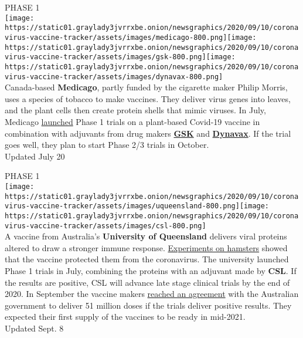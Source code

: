 PHASE 1\\
\texttt{[image: https://static01.graylady3jvrrxbe.onion/newsgraphics/2020/09/10/coronavirus-vaccine-tracker/assets/images/medicago-800.png]}\texttt{[image: https://static01.graylady3jvrrxbe.onion/newsgraphics/2020/09/10/coronavirus-vaccine-tracker/assets/images/gsk-800.png]}\texttt{[image: https://static01.graylady3jvrrxbe.onion/newsgraphics/2020/09/10/coronavirus-vaccine-tracker/assets/images/dynavax-800.png]}\\
Canada-based \textbf{\textbf{Medicago}}, partly funded by the cigarette
maker Philip Morris, uses a species of tobacco to make vaccines. They
deliver virus genes into leaves, and the plant cells then create protein
shells that mimic viruses. In July, Medicago
\href{https://www.medicago.com/en/newsroom/medicago-begins-phase-i-clinical-trials-for-its-covid-19-vaccine-candidate/}{launched}
Phase 1 trials on a plant-based Covid-19 vaccine in combination with
adjuvants from drug makers
\textbf{\textbf{\href{https://www.medicago.com/en/newsroom/gsk-and-medicago-announce-collaboration-to-develop-a-novel-adjuvanted-covid-19-candidate-vaccine/}{GSK}}}
and
\textbf{\textbf{\href{https://www.medicago.com/en/newsroom/dynavax-and-medicago-announce-collaboration-to-develop-a-novel-adjuvanted-covid-19-vaccine-candidate/}{Dynavax}}}.
If the trial goes well, they plan to start Phase 2/3 trials in
October.\\
Updated July 20

PHASE 1\\
\texttt{[image: https://static01.graylady3jvrrxbe.onion/newsgraphics/2020/09/10/coronavirus-vaccine-tracker/assets/images/uqueensland-800.png]}\texttt{[image: https://static01.graylady3jvrrxbe.onion/newsgraphics/2020/09/10/coronavirus-vaccine-tracker/assets/images/csl-800.png]}\\
A vaccine from Australia's \textbf{\textbf{University of Queensland}}
delivers viral proteins altered to draw a stronger immune response.
\href{https://www.uq.edu.au/news/article/2020/08/uq-vaccine-scientists-report-positive-results-pre-clinical-testing}{Experiments
on hamsters} showed that the vaccine protected them from the
coronavirus. The university launched Phase 1 trials in July, combining
the proteins with an adjuvant made by \textbf{\textbf{CSL}}. If the
results are positive, CSL will advance late stage clinical trials by the
end of 2020. In September the vaccine makers
\href{https://www.uq.edu.au/news/article/2020/09/csl-signs-agreement-australian-government-uq-vaccine-supply}{reached
an agreement} with the Australian government to deliver 51 million doses
if the trials deliver positive results. They expected their first supply
of the vaccines to be ready in mid-2021.\\
Updated Sept. 8

